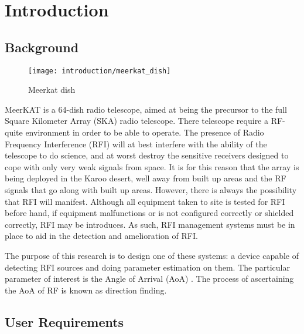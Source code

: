 \chapter{Introduction}
\section{Background}
\begin{wrapfigure}{r}{0.4\textwidth}
  \begin{center}
    \texttt{[image: introduction/meerkat\_dish]}
  \end{center}
  \caption{Meerkat dish}
\end{wrapfigure}
MeerKAT is a 64-dish radio telescope, aimed at being the precursor to the full Square Kilometer Array (SKA)  radio telescope. 
There telescope require a RF-quite environment in order to be able to operate. 
The presence of Radio Frequency Interference (RFI)  will at best interfere with the ability of the telescope to do science, and at worst destroy the sensitive receivers designed to cope with only very weak signals from space. 
It is for this reason that the array is being deployed in the Karoo desert, well away from built up areas and the RF signals that go along with built up areas. 
However, there is always the possibility that RFI will manifest. 
Although all equipment taken to site is tested for RFI before hand, if equipment malfunctions or is not configured correctly or shielded correctly, RFI may be introduces.
As such, RFI management systems must be in place to aid in the detection and amelioration of RFI.

The purpose of this research is to design one of these systems: a device capable of detecting RFI sources and doing parameter estimation on them. The particular parameter of interest is the Angle of Arrival (AoA) . The process of ascertaining the AoA of RF is known as direction finding.


\section{User Requirements}

